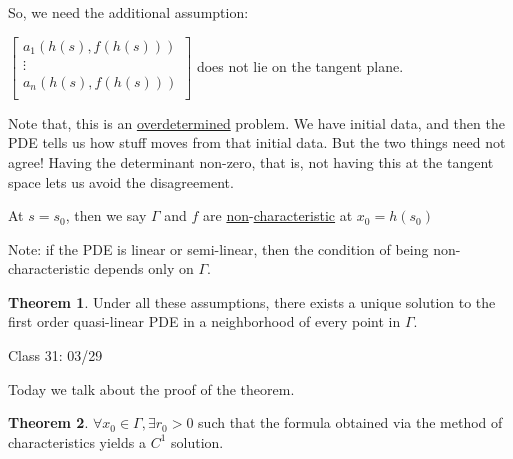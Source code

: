\documentclass{article}
\theoremstyle{definition}
\newtheorem{theorem}{Theorem}
\begin{document}
So, we need the additional assumption:

\(\begin{bmatrix}
     a_1(h(s),f(h(s))) \\
     \vdots \\
     a_n(h(s),f(h(s))) \\
\end{bmatrix}\) does not lie on the tangent plane.

Note that, this is an \underline{overdetermined} problem. We have initial data, and then the PDE tells us how stuff moves from that initial data. But the two things need not agree! Having the determinant non-zero, that is, not having this at the tangent space lets us avoid the disagreement.

At \(s=s_0\), then we say \(\Gamma\) and \(f\) are \underline{non}-\underline{characteristic} at \(x_0 = h(s_0)\)

Note: if the PDE is linear or semi-linear, then the condition of being non-characteristic depends only on \(\Gamma\).

\begin{theorem}
    Under all these assumptions, there exists a unique solution to the first order quasi-linear PDE in a neighborhood of every point in \(\Gamma\). 
\end{theorem}

\hrulefill

Class 31: 03/29

Today we talk about the proof of the theorem.

\begin{theorem}
    \(\forall x_0\in \Gamma , \exists r_0 > 0\) such that the formula obtained via the method of characteristics yields a \(C^1\) solution. 
\end{theorem}
\end{document}
